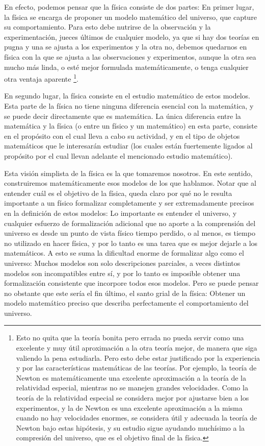 \documentclass{article}
\begin{document}
En efecto, podemos pensar que la física consiste de dos partes: En primer lugar, la física se encarga de proponer un modelo matemático
del universo, que capture su comportamiento. Para esto debe nutrirse de la observación y la experimentación, jueces últimos de
cualquier modelo, ya que si hay dos teorías en pugna y una se ajusta a los experimentos y la otra no, debemos quedarnos en física
con la que se ajusta a las observaciones y experimentos, aunque la otra sea mucho más linda, o esté mejor formulada matemáticamente,
o tenga cualquier otra ventaja aparente \footnote{Esto no quita que la teoría bonita pero errada no pueda servir como una excelente y muy útil
aproximación a la otra teoría mejor, de manera que siga valiendo la pena estudiarla. Pero esto debe estar justificado por la experiencia y
por las características matemáticas de las teorías. Por ejemplo, la teoría de Newton es matemáticamente una excelente aproximación
a la teoría de la relatividad especial, mientras no se manejen grandes velocidades. Como la teoría de la relatividad especial se
considera mejor por ajustarse bien a los experimentos, y la de Newton es una excelente aproximación a la misma cuando no hay
velocidades enormes, se considera útil y adecuada la teoría de Newton bajo estas hipótesis, y su estudio sigue ayudando muchísimo
a la compresión del universo, que es el objetivo final de la física.}.

En segundo lugar, la física consiste en el estudio matemático de estos modelos. Esta parte de la física no tiene ninguna diferencia
esencial con la matemática, y se puede decir directamente que es matemática. La única diferencia entre la matemática y la física
(o entre un físico y un matemático) en esta parte, consiste en el propósito con el cual lleva a cabo su actividad, y en
el tipo de objetos matemáticos que le interesarán estudiar (los cuales están fuertemente ligados al propósito por el cual llevan
adelante el mencionado estudio matemático).

Esta visión simplista de la física es la que tomaremos nosotros. En este sentido, construiremos matemáticamente esos modelos
de los que hablamos. Notar que al entender cuál es el objetivo de la física, queda claro por qué no le resulta importante a un físico
formalizar completamente y ser extremadamente precisos en la definición de estos modelos: Lo importante es entender el universo,
y cualquier esfuerzo de formalización adicional que no aporte a la comprensión del universo es desde un punto de vista físico tiempo
perdido, o al menos, es tiempo no utilizado en hacer física, y por lo tanto es una tarea que es mejor dejarle a los matemáticos.
A esto se suma la dificultad enorme de formalizar algo como el universo: Muchos modelos son solo descripciones parciales, a veces
distintos modelos son incompatibles entre sí, y por lo tanto es imposible obtener una formalización consistente que incorpore todos
esos modelos. Pero se puede pensar no obstante que este sería el fin último, el santo grial de la física: Obtener un modelo matemático
preciso que describa perfectamente el comportamiento del universo.
\end{document}
